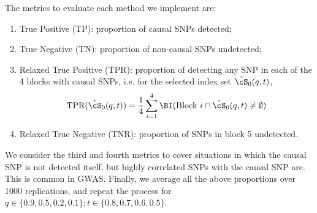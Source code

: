 The metrics to evaluate each method we implement are:

\begin{enumerate}
\item True Positive (TP): proportion of causal SNPs detected;

\item True Negative (TN): proportion of non-causal SNPs undetected;

\item Relaxed True Positive (TPR): proportion of detecting any SNP in each of the 4 blocks with causal SNPs, i.e. for the selected index set $\hat \cS_0 (q,t)$,
%
$$
\text{TPR} ( \hat \cS_0 (q,t) ) = \frac{1}{4} \sum_{i=1}^4 \BI ( \text{Block } i \cap \hat \cS_0 (q,t) \neq \emptyset )
$$
%

\item Relaxed True Negative (TNR): proportion of SNPs in block 5 undetected.
\end{enumerate}

\noindent We consider the third and fourth metrics to cover situations in which the causal SNP is not detected itself, but highly correlated SNPs with the causal SNP are. This is common in GWAS. Finally, we average all the above proportions over 1000 replications, and repeat the process for $ q \in \{ 0.9, 0.5, 0.2, 0.1 \}; t \in \{ 0.8, 0.7, 0.6, 0.5 \}$.


